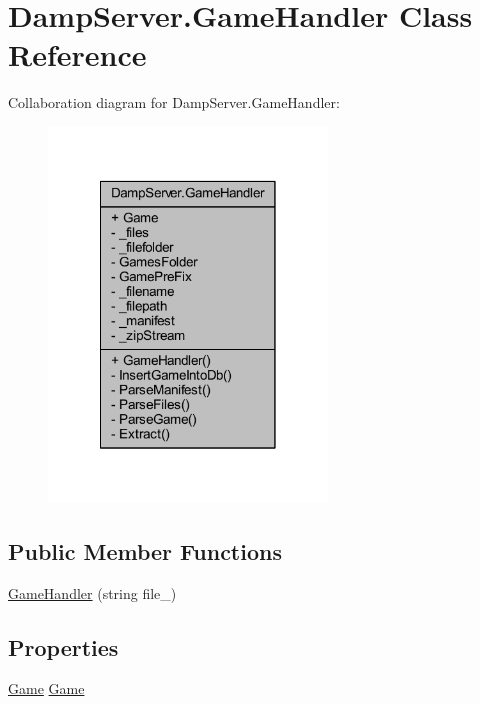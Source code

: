 \hypertarget{class_damp_server_1_1_game_handler}{\section{Damp\-Server.\-Game\-Handler Class Reference}
\label{class_damp_server_1_1_game_handler}
}


Collaboration diagram for Damp\-Server.\-Game\-Handler\-:
\nopagebreak
\begin{figure}[H]
\begin{center}
\leavevmode
\includegraphics[width=210pt]{class_damp_server_1_1_game_handler__coll__graph}
\end{center}
\end{figure}
\subsection*{Public Member Functions}
\begin{DoxyCompactItemize}
\item 
\hyperlink{class_damp_server_1_1_game_handler_a9eea31ed615bb0f249650455ce59d20a}{Game\-Handler} (string file\-\_\-)
\end{DoxyCompactItemize}
\subsection*{Properties}
\begin{DoxyCompactItemize}
\item 
\hyperlink{class_damp_server_1_1_game}{Game} \hyperlink{class_damp_server_1_1_game_handler_ab35a15438022b146c719e7b00f653ada}{Game}
\end{DoxyCompactItemize}
